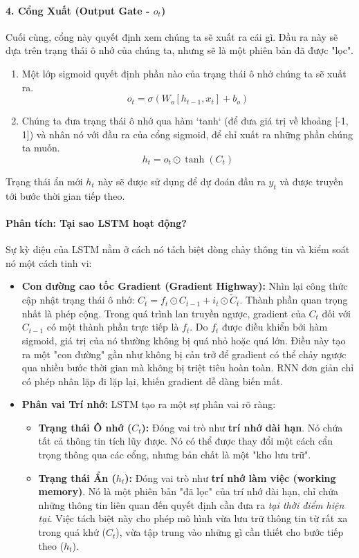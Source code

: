 \paragraph{4. Cổng Xuất (Output Gate - $o_t$)}
Cuối cùng, cổng này quyết định xem chúng ta sẽ xuất ra cái gì. Đầu ra này sẽ dựa trên trạng thái ô nhớ của chúng ta, nhưng sẽ là một phiên bản đã được "lọc".
\begin{enumerate}
    \item Một lớp sigmoid quyết định phần nào của trạng thái ô nhớ chúng ta sẽ xuất ra.
        $$ o_t = \sigma(W_o [h_{t-1}, x_t] + b_o) $$
    \item Chúng ta đưa trạng thái ô nhớ qua hàm `tanh` (để đưa giá trị về khoảng [-1, 1]) và nhân nó với đầu ra của cổng sigmoid, để chỉ xuất ra những phần chúng ta muốn.
        $$ h_t = o_t \odot \tanh(C_t) $$
\end{enumerate}
Trạng thái ẩn mới $h_t$ này sẽ được sử dụng để dự đoán đầu ra $y_t$ và được truyền tới bước thời gian tiếp theo.
\paragraph{Phân tích: Tại sao LSTM hoạt động?}
Sự kỳ diệu của LSTM nằm ở cách nó tách biệt dòng chảy thông tin và kiểm soát nó một cách tinh vi:
\begin{itemize}
    \item \textbf{Con đường cao tốc Gradient (Gradient Highway):} Nhìn lại công thức cập nhật trạng thái ô nhớ: $C_t = f_t \odot C_{t-1} + i_t \odot \tilde{C}_t$. Thành phần quan trọng nhất là phép cộng. Trong quá trình lan truyền ngược, gradient của $C_t$ đối với $C_{t-1}$ có một thành phần trực tiếp là $f_t$. Do $f_t$ được điều khiển bởi hàm sigmoid, giá trị của nó thường không bị quá nhỏ hoặc quá lớn. Điều này tạo ra một "con đường" gần như không bị cản trở để gradient có thể chảy ngược qua nhiều bước thời gian mà không bị triệt tiêu hoàn toàn. RNN đơn giản chỉ có phép nhân lặp đi lặp lại, khiến gradient dễ dàng biến mất.
    
    \item \textbf{Phân vai Trí nhớ:} LSTM tạo ra một sự phân vai rõ ràng:
        \begin{itemize}
            \item \textbf{Trạng thái Ô nhớ ($C_t$):} Đóng vai trò như \textbf{trí nhớ dài hạn}. Nó chứa tất cả thông tin tích lũy được. Nó có thể được thay đổi một cách cẩn trọng thông qua các cổng, nhưng bản chất là một "kho lưu trữ".
            \item \textbf{Trạng thái Ẩn ($h_t$):} Đóng vai trò như \textbf{trí nhớ làm việc (working memory)}. Nó là một phiên bản "đã lọc" của trí nhớ dài hạn, chỉ chứa những thông tin liên quan đến quyết định cần đưa ra \textit{tại thời điểm hiện tại}. Việc tách biệt này cho phép mô hình vừa lưu trữ thông tin từ rất xa trong quá khứ ($C_t$), vừa tập trung vào những gì cần thiết cho bước tiếp theo ($h_t$).
        \end{itemize}
\end{itemize}
